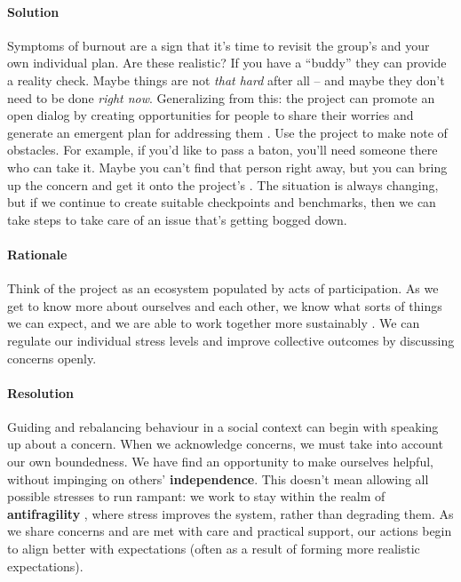 \begin{refsection}
\paragraph{Solution}

Symptoms of burnout are a sign that it's time to revisit the group's  and your own individual plan.  Are these realistic?  If you have a ``buddy'' they can provide a reality check.   Maybe things are not \emph{that hard} after all -- and maybe they don't need to be done \emph{right now}.  Generalizing from this: the project can promote an open dialog by creating opportunities for people to share their worries and generate an emergent plan for addressing them \cite{seikkula2006dialogical}.  Use the project  to make note of obstacles.  For example, if you'd like to pass a baton, you'll need someone there who can take it.  Maybe you can't find that person right away, but you can bring up the concern and get it onto the project's .  The situation is always changing, but if we continue to create suitable checkpoints and benchmarks, then we can take steps to take care of an issue that's getting bogged down.    

\paragraph{Rationale}

Think of the project as an ecosystem populated by acts of participation.  As we get to know more about ourselves and each other, we know what sorts of things we can expect, and we are able to work together more sustainably \cite{ostrom2010revising}.
%
We can regulate our individual stress levels and improve collective outcomes by discussing concerns openly.

\paragraph{Resolution}

Guiding and rebalancing behaviour in a social context can begin with speaking up about a concern.  When we acknowledge concerns, we must take into account our own boundedness.  We have find an opportunity to make ourselves helpful, without impinging on others' \textbf{independence}.   This doesn't mean allowing all possible stresses to run rampant: we work to stay within the realm of \textbf{antifragility} \cite{taleb2012antifragile}, where stress improves the system, rather than degrading them. 
%
As we share concerns and are met with care and practical support, our actions begin to align better with expectations (often as a result of forming more realistic expectations). 


\end{refsection}

